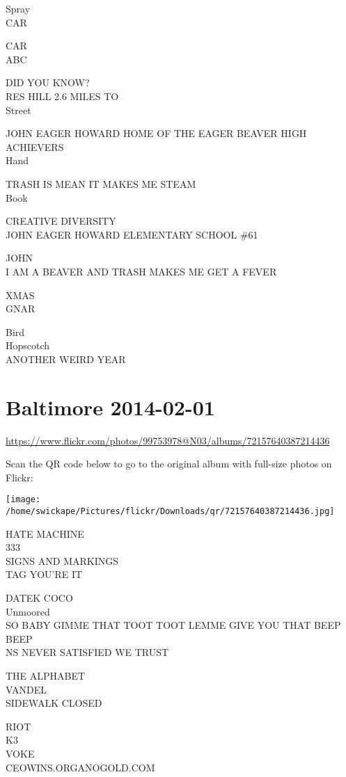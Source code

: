 \documentclass[10pt,letterpaper]{article}
\begin{document}
Spray\\
CAR

CAR\\
ABC

DID YOU KNOW?\\
RES HILL 2.6 MILES TO\\
Street

JOHN EAGER HOWARD HOME OF THE EAGER BEAVER HIGH ACHIEVERS\\
Hand

TRASH IS MEAN IT MAKES ME STEAM\\
Book

CREATIVE DIVERSITY\\
JOHN EAGER HOWARD ELEMENTARY SCHOOL \#61

JOHN\\
I AM A BEAVER AND TRASH MAKES ME GET A FEVER

XMAS\\
GNAR

Bird\\
Hopscotch\\
ANOTHER WEIRD YEAR
\pagebreak

\section*{Baltimore 2014-02-01}

\url{https://www.flickr.com/photos/99753978@N03/albums/72157640387214436}

Scan the QR code below to go to the original album with full-size photos on Flickr:

\texttt{[image: /home/swickape/Pictures/flickr/Downloads/qr/72157640387214436.jpg]}
\pagebreak

HATE MACHINE\\
333\\
SIGNS AND MARKINGS\\
TAG YOU'RE IT

DATEK COCO\\
Unmoored\\
SO BABY GIMME THAT TOOT TOOT LEMME GIVE YOU THAT BEEP BEEP\\
NS NEVER SATISFIED WE TRUST

THE ALPHABET\\
VANDEL\\
SIDEWALK CLOSED

RIOT\\
K3\\
VOKE\\
CEOWINS.ORGANOGOLD.COM
\end{document}
